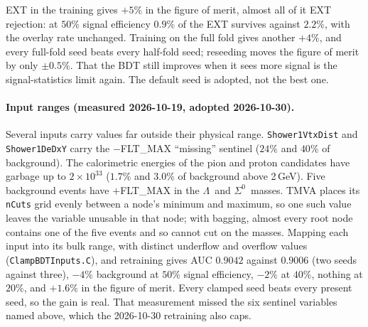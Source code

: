 \documentclass[11pt,a4paper]{article}
\newcommand{\Szero}{\ensuremath{\Sigma^{0}}}
\newcommand{\Lam}{\ensuremath{\Lambda}}
\begin{document}
\begin{center}
\end{center}

\noindent EXT in the training gives $+5\%$ in the figure of merit, almost all of it
EXT rejection: at $50\%$ signal efficiency $0.9\%$ of the EXT survives against $2.2\%$,
with the overlay rate unchanged. Training on the full fold gives another $+4\%$, and
every full-fold seed beats every half-fold seed; reseeding moves the figure of merit
by only $\pm0.5\%$. That the BDT still improves when it sees more signal is the
signal-statistics limit again. The default seed is adopted, not the best one.

\paragraph{Input ranges (measured 2026-10-19, adopted 2026-10-30).} Several inputs carry values
far outside their physical range. \texttt{Shower1VtxDist} and \texttt{Shower1DeDxY}
carry the $-$FLT\_MAX ``missing'' sentinel ($24\%$ and $40\%$ of background). The
calorimetric energies of the pion and proton candidates have garbage up to $2\times10^{33}$
($1.7\%$ and $3.0\%$ of background above 2\,GeV). Five background events have
$+$FLT\_MAX in the \Lam\ and \Szero\ masses. TMVA places its \texttt{nCuts} grid evenly
between a node's minimum and maximum, so one such value leaves the variable unusable in
that node; with bagging, almost every root node contains one of the five events and so
cannot cut on the masses. Mapping each input into its bulk range, with distinct underflow
and overflow values (\texttt{ClampBDTInputs.C}), and retraining gives AUC $0.9042$ against
$0.9006$ (two seeds against three), $-4\%$ background at $50\%$ signal efficiency, $-2\%$ at
$40\%$, nothing at $20\%$, and $+1.6\%$ in the figure of merit. Every clamped seed beats every
present seed, so the gain is real. That measurement missed the six sentinel variables
named above, which the 2026-10-30 retraining also caps.
\end{document}
